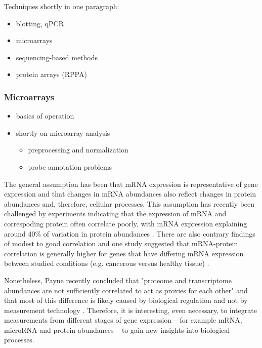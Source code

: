 Techniques shortly in one paragraph:
\begin{itemize}
  \item blotting, qPCR
  \item microarrays
  \item sequencing-based methods
  \item protein arrays (RPPA)
\end{itemize}


\subsubsection{Microarrays}

\begin{itemize}
  \item basics of operation
  \item shortly on microarray analysis
  \begin{itemize}
    \item preprocessing and normalization
    \item probe annotation problems
  \end{itemize}
\end{itemize}


The general assumption has been that mRNA expression is representative of gene
expression and that changes in mRNA abundances also reflect changes in protein
abundances and, therefore, cellular processes. This assumption has recently
been challenged by experiments indicating that the expression of mRNA and
correspoding protein often correlate poorly, with mRNA expression 
explaining around 40\% of variation in protein abundances \citep{Vogel2012}.
There are also contrary findings of modest to good correlation
and one study suggested that mRNA-protein correlation is generally higher for
genes that have differing mRNA expression between studied conditions
(e.g. cancerous versus healthy tissue) \citep{Koussounadis2015}.

Nonetheless, Payne recently concluded that "proteome and transcriptome abundances are not
sufficiently correlated to act as proxies for each other" and that
most of this difference is likely caused by biological regulation and not
by measurement technology \cite{Payne2015}.
Therefore, it is interesting, even necessary, to integrate
measurements from different stages of gene expression -- for example
mRNA, microRNA and protein abundances -- to gain new insights
into biological processes.




















